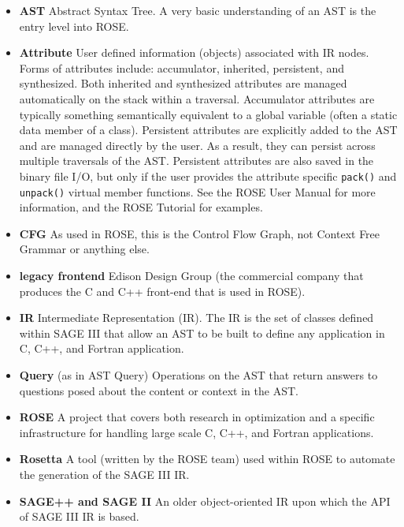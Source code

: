 \begin{itemize}
   \item {\bf AST} Abstract Syntax Tree. A very basic understanding of an AST is the
                   entry level into ROSE.

   \item {\bf Attribute} User defined information (objects) associated with IR nodes.
    Forms of attributes include: accumulator, inherited, persistent, and synthesized.
    Both inherited and synthesized attributes are managed automatically on the stack within a
    traversal.  Accumulator attributes are typically something semantically equivalent to a
    global variable (often a static data member of a class).  Persistent attributes 
    are explicitly added to the AST and are managed directly by the user.  As a result,
    they can persist across multiple traversals of the AST.  Persistent attributes are
    also saved in the binary file I/O, but only if the user provides the attribute
    specific {\tt pack()} and {\tt unpack()} virtual member functions.  See the ROSE
    User Manual for more information, and the ROSE Tutorial for examples.

   \item {\bf CFG} As used in ROSE, this is the Control Flow Graph, not Context Free
    Grammar or anything else.

   \item {\bf legacy frontend} Edison Design Group (the commercial company that produces the C and C++
    front-end that is used in ROSE).

   \item {\bf IR} Intermediate Representation (IR).  The IR is the set of classes defined
    within SAGE III that allow an AST to be built to define any application in C, C++,
    and Fortran application.

   \item {\bf Query} (as in AST Query) Operations on the AST that return answers to
    questions posed about the content or context in the AST.

   \item {\bf ROSE} A project that covers both research in optimization and a specific
    infrastructure for handling large scale C, C++, and Fortran applications.

   \item {\bf Rosetta} A tool (written by the ROSE team) used within ROSE to automate the
    generation of the SAGE III IR.

   \item {\bf SAGE++ and SAGE II} An older object-oriented IR upon which the API of 
   SAGE III IR is based.


\end{itemize}
